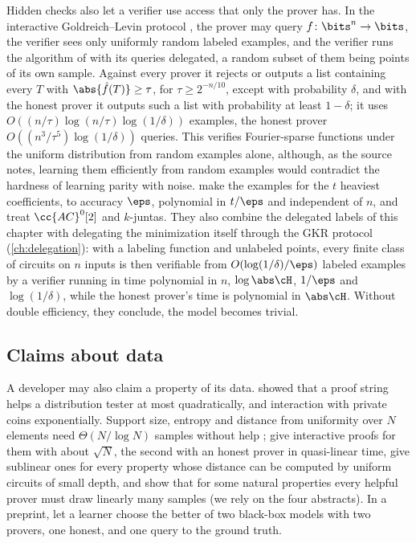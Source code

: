 \begin{refsection}
Hidden checks also let a verifier use access that only the prover has. In the interactive Goldreich--Levin protocol \parencite[Lemma~2.3]{GoldwasserEtAl2021}, the prover may query $f\colon\bits^n\to\bits$, the verifier sees only uniformly random labeled examples, and the verifier runs the algorithm of \textcite{GoldreichLevin1989} with its queries delegated, a random subset of them being points of its own sample. Against every prover it rejects or outputs a list containing every $T$ with $\abs{\hat f(T)}\ge\tau$, for $\tau\ge2^{-n/10}$, except with probability $\delta$, and with the honest prover it outputs such a list with probability at least $1-\delta$; it uses $O((n/\tau)\log(n/\tau)\log(1/\delta))$ examples, the honest prover $O((n^3/\tau^5)\log(1/\delta))$ queries. This verifies Fourier-sparse functions under the uniform distribution from random examples alone, although, as the source notes, learning them efficiently from random examples would contradict the hardness of learning parity with noise. \Textcite{GurEtAl2024} make the examples for the $t$ heaviest coefficients, to accuracy $\eps$, polynomial in $t/\eps$ and independent of $n$, and treat $\cc{AC}^0[2]$ and $k$-juntas. They also combine the delegated labels of this chapter with delegating the minimization itself through the GKR protocol (\cref{ch:delegation}): with a labeling function and unlabeled points, every finite class of circuits on $n$ inputs is then verifiable from $O(\log(1/\delta)/\eps)$ labeled examples by a verifier running in time polynomial in $n$, $\log\abs\cH$, $1/\eps$ and $\log(1/\delta)$, while the honest prover's time is polynomial in $\abs\cH$. Without double efficiency, they conclude, the model becomes trivial.

\subsection{Claims about data}

A developer may also claim a property of its data. \Textcite{ChiesaGur2018} showed that a proof string helps a distribution tester at most quadratically, and interaction with private coins exponentially. Support size, entropy and distance from uniformity over $N$ elements need $\Theta(N/\log N)$ samples without help \parencite{ValiantValiant2011}; \textcite{HermanRothblum2022,HermanRothblum2023} give interactive proofs for them with about $\sqrt N$, the second with an honest prover in quasi-linear time, \textcite{HermanRothblum2024} give sublinear ones for every property whose distance can be computed by uniform circuits of small depth, and \textcite{HermanRothblum2025} show that for some natural properties every helpful prover must draw linearly many samples (we rely on the four abstracts). In a preprint, \textcite{CanettiLinderWagaman2025} let a learner choose the better of two black-box models with two provers, one honest, and one query to the ground truth.


\end{refsection}
